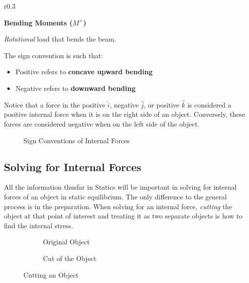 \documentclass[12pt]{article}
\begin{document}
\begin{wrapfigure}[3]{r}{0.3\textwidth}
  \vspace{-35pt}
  \centering
  
  \label{fig:022}
\end{wrapfigure}
\begin{center}
  {\large \textbf{Bending Moments ($M^+$)}}
\end{center}
\textit{Rotational} load that bends the beam.

The sign convention is such that:
\begin{itemize}
  \itemsep0em
  \item Positive refers to \textbf{concave upward bending}
  \item Negative refers to \textbf{downward bending}
\end{itemize}

Notice that a force in the positive $\hat{i}$, negative $\hat{j}$, or positive $\hat{k}$
is considered a positive internal force when it is on the right side of an object.
Conversely, these forces are considered negative when on the left side of the object.

\begin{figure}[H]
  \vspace{-15pt}
  \centering
  
  \caption{Sign Conventions of Internal Forces}
  \label{fig:028}
\end{figure}

\subsection{Solving for Internal Forces}
\label{ssec:solvingForInternalForces}

All the information thusfar in Statics will be important in solving for internal forces
of an object in static equilibrium. The only difference to the general process is in the
preparation. When solving for an internal force, \textit{cutting} the object at that point
of interest and treating it as two separate objects is how to find the internal stress.

\begin{figure}[H]
  \centering
  \begin{subfigure}[H]{0.45\textwidth}
    \centering
    
    \caption{Original Object}
    \label{fig:originalObject}
  \end{subfigure}
  \begin{subfigure}[H]{0.45\textwidth}
    \centering
    
    \caption{Cut of the Object}
    \label{fig:cutOfTheObject}
  \end{subfigure}
  \caption{Cutting an Object}
  \label{fig:023}
\end{figure}
\end{document}
